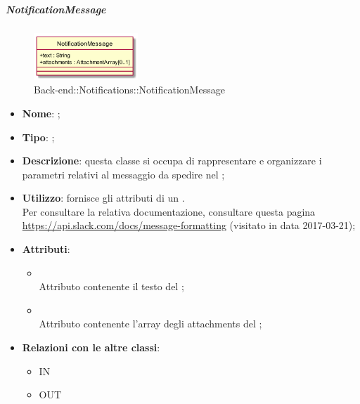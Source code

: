 \hypertarget{NotificationMessage_label}{\subparagraph{NotificationMessage}}
\begin{figure}[h]
	\centering
	\includegraphics[width=0.35\textwidth,height=\textheight,keepaspectratio]{images/ClassNotificationMessage.png}
	\caption{Back-end::Notifications::NotificationMessage}
\end{figure}
\begin{itemize}
	\item \textbf{Nome}: ;
	\item \textbf{Tipo}: ;
	\item \textbf{Descrizione}: questa classe si occupa di rappresentare e organizzare i parametri relativi al messaggio da spedire nel ;
	\item \textbf{Utilizzo}: fornisce gli attributi di un . \\ Per consultare la relativa documentazione, consultare questa pagina \url{https://api.slack.com/docs/message-formatting} (visitato in data 2017-03-21);
	\item \textbf{Attributi}:
	\begin{itemize}
		\item[]  \\
		Attributo contenente il testo del ;
		\item[]  \\
		Attributo contenente l'array degli attachments del ;
	\end{itemize}
	\item \textbf{Relazioni con le altre classi}:
	\begin{itemize}
		\item IN \hyperlink{NotificationService_label}{}
		\item OUT \hyperlink{Attachment_label}{}
	\end{itemize}
\end{itemize}
\FloatBarrier

